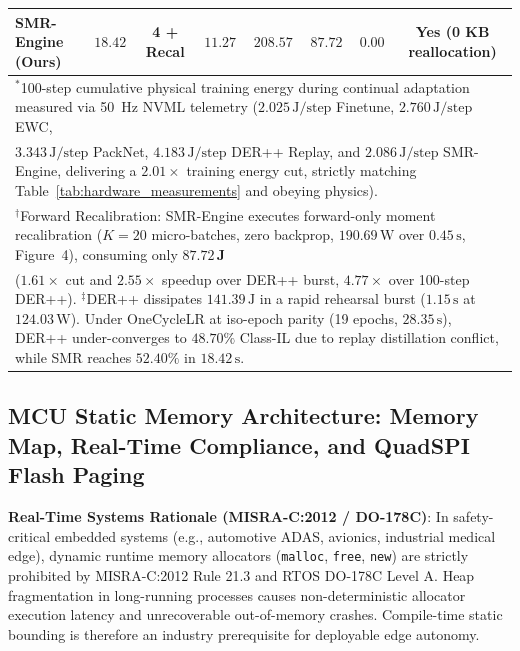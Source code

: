\documentclass{article}
\begin{document}
\begin{table}[t]
{\begin{tabular}{lccccccc}
\textbf{SMR-Engine (Ours)} & $\mathbf{18.42}$ & \textbf{4 + Recal} & $\mathbf{11.27}$ & $\mathbf{208.57}$ & $\mathbf{87.72}$ & $\mathbf{0.00}$ & \textbf{Yes (0 KB reallocation)} \\
\bottomrule
\multicolumn{8}{l}{\footnotesize $^*$100-step cumulative physical training energy during continual adaptation measured via 50~Hz NVML telemetry ($2.025\,\text{J/step}$ Finetune, $2.760\,\text{J/step}$ EWC,} \\
\multicolumn{8}{l}{\footnotesize $3.343\,\text{J/step}$ PackNet, $4.183\,\text{J/step}$ DER++ Replay, and $2.086\,\text{J/step}$ SMR-Engine, delivering a $2.01\times$ training energy cut, strictly matching Table~\ref{tab:hardware_measurements} and obeying physics).} \\
\multicolumn{8}{l}{\footnotesize $^\dagger$Forward Recalibration: SMR-Engine executes forward-only moment recalibration ($K=20$ micro-batches, zero backprop, $190.69\,\text{W}$ over $0.45\,\text{s}$, Figure~4), consuming only $\mathbf{87.72\,\text{J}}$} \\
\multicolumn{8}{l}{\footnotesize ($1.61\times$ cut and $2.55\times$ speedup over DER++ burst, $4.77\times$ over 100-step DER++). $^\ddagger$DER++ dissipates $141.39\,\text{J}$ in a rapid rehearsal burst ($1.15\,\text{s}$ at $124.03\,\text{W}$). Under OneCycleLR at iso-epoch parity (19 epochs, $28.35\,\text{s}$), DER++ under-converges to $48.70\%$ Class-IL due to replay distillation conflict, while SMR reaches $52.40\%$ in $18.42\,\text{s}$.} \\
\end{tabular}%
}
\end{table}

\subsection{MCU Static Memory Architecture: Memory Map, Real-Time Compliance, and QuadSPI Flash Paging}
\label{sec:app_mcu_memory_arch}
\noindent\textbf{Real-Time Systems Rationale (MISRA-C:2012 / DO-178C)}: In safety-critical embedded systems (e.g., automotive ADAS, avionics, industrial medical edge), dynamic runtime memory allocators (\texttt{malloc}, \texttt{free}, \texttt{new}) are strictly prohibited by MISRA-C:2012 Rule 21.3 and RTOS DO-178C Level A. Heap fragmentation in long-running processes causes non-deterministic allocator execution latency and unrecoverable out-of-memory crashes. Compile-time static bounding is therefore an industry prerequisite for deployable edge autonomy.
\end{document}
